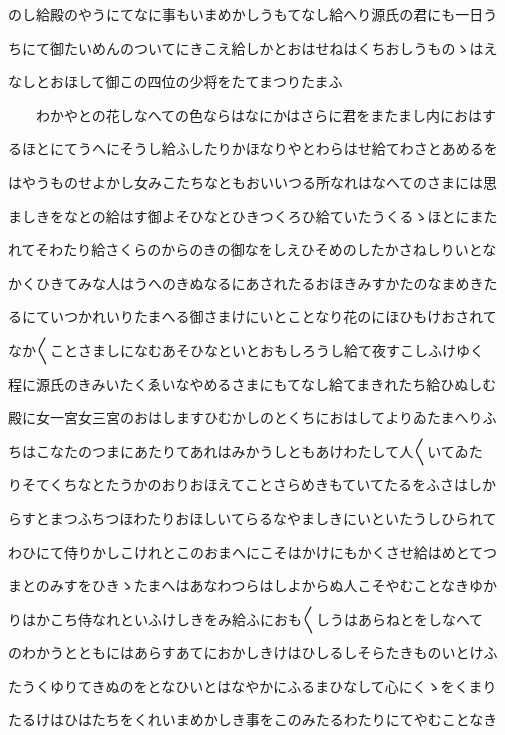 \documentclass[a4paper,11pt,landscape]{ltjtarticle}
\begin{document}
のし給殿のやうにてなに事もいまめかしうもてなし給へり源氏の君にも一日う
\par\medskip
ちにて御たいめんのついてにきこえ給しかとおはせねはくちおしうものゝはえ
\par\medskip
なしとおほして御この四位の少将をたてまつりたまふ
\par\medskip
　　わかやとの花しなへての色ならはなにかはさらに君をまたまし内におはす
\par\medskip
るほとにてうへにそうし給ふしたりかほなりやとわらはせ給てわさとあめるを
\par\medskip
はやうものせよかし女みこたちなともおいいつる所なれはなへてのさまには思
\par\medskip
ましきをなとの給はす御よそひなとひきつくろひ給ていたうくるゝほとにまた
\par\medskip
れてそわたり給さくらのからのきの御なをしえひそめのしたかさねしりいとな
\par\medskip
かくひきてみな人はうへのきぬなるにあされたるおほきみすかたのなまめきた
\par\medskip
るにていつかれいりたまへる御さまけにいとことなり花のにほひもけおされて
\par\medskip
なか〱ことさましになむあそひなといとおもしろうし給て夜すこしふけゆく
\par\medskip
程に源氏のきみいたくゑいなやめるさまにもてなし給てまきれたち給ひぬしむ
\par\medskip
殿に女一宮女三宮のおはしますひむかしのとくちにおはしてよりゐたまへりふ
\par\medskip
ちはこなたのつまにあたりてあれはみかうしともあけわたして人〱いてゐた
\par\medskip
りそてくちなとたうかのおりおほえてことさらめきもていてたるをふさはしか
\par\medskip
らすとまつふちつほわたりおほしいてらるなやましきにいといたうしひられて
\par\medskip
わひにて侍りかしこけれとこのおまへにこそはかけにもかくさせ給はめとてつ
\par\medskip
まとのみすをひきゝたまへはあなわつらはしよからぬ人こそやむことなきゆか
\par\medskip
りはかこち侍なれといふけしきをみ給ふにおも〱しうはあらねとをしなへて
\par\medskip
のわかうとともにはあらすあてにおかしきけはひしるしそらたきものいとけふ
\par\medskip
たうくゆりてきぬのをとなひいとはなやかにふるまひなして心にくゝをくまり
\par\medskip
たるけはひはたちをくれいまめかしき事をこのみたるわたりにてやむことなき
\end{document}
